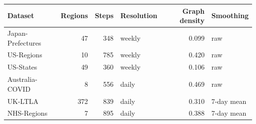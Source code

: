 \begin{tabular}{lrrlrl}
\hline
Dataset & Regions & Steps & Resolution & Graph density & Smoothing \\
\hline
Japan-Prefectures & 47 & 348 & weekly & 0.099 & raw \\
US-Regions & 10 & 785 & weekly & 0.420 & raw \\
US-States & 49 & 360 & weekly & 0.106 & raw \\
Australia-COVID & 8 & 556 & daily & 0.469 & raw \\
UK-LTLA & 372 & 839 & daily & 0.310 & 7-day mean \\
NHS-Regions & 7 & 895 & daily & 0.388 & 7-day mean \\
\hline
\end{tabular}
